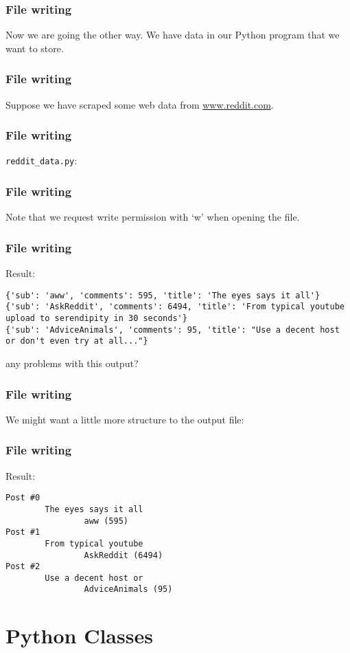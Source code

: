 \documentclass{beamer}
\begin{document}
\begin{frame}
\frametitle{File writing}
Now we are going the other way.  We have data in our Python program that we want to store.
\end{frame}

\begin{frame}
\frametitle{File writing}
Suppose we have scraped some web data from \url{www.reddit.com}.
\end{frame}

\begin{frame}
\frametitle{File writing}
\texttt{reddit\_data.py}:
\end{frame}

\begin{frame}
\frametitle{File writing}
Note that we request write permission with `w' when opening the file.
\end{frame}

\begin{frame}[fragile]
\frametitle{File writing}
Result:
\begin{verbatim}
{'sub': 'aww', 'comments': 595, 'title': 'The eyes says it all'}
{'sub': 'AskReddit', 'comments': 6494, 'title': 'From typical youtube upload to serendipity in 30 seconds'}
{'sub': 'AdviceAnimals', 'comments': 95, 'title': "Use a decent host or don't even try at all..."}
\end{verbatim}
\vspace{0.2in}
any problems with this output?
\end{frame}

\begin{frame}
\frametitle{File writing}
We might want a little more structure to the output file:
\end{frame}

\begin{frame}[fragile]
\frametitle{File writing}
Result:
\begin{verbatim}
Post #0
        The eyes says it all
                aww (595)
Post #1
        From typical youtube
                AskReddit (6494)
Post #2
        Use a decent host or
                AdviceAnimals (95)
\end{verbatim}
\end{frame}

\section{Python Classes}
\end{document}
